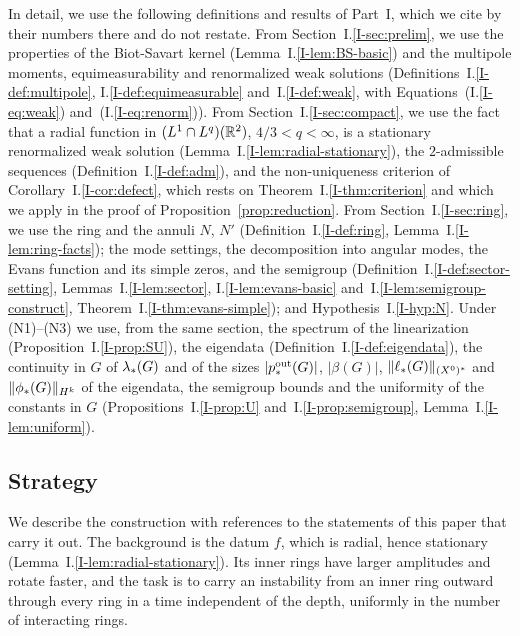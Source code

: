 In detail, we use the following definitions and results of Part~I, which we
cite by their numbers there and do not restate. From
Section~I.\ref{I-sec:prelim}, we use the properties of the Biot-Savart kernel
(Lemma~I.\ref{I-lem:BS-basic}) and the multipole moments, equimeasurability and
renormalized weak solutions (Definitions~I.\ref{I-def:multipole},
I.\ref{I-def:equimeasurable} and~I.\ref{I-def:weak}, with
Equations~(I.\ref{I-eq:weak}) and~(I.\ref{I-eq:renorm})). From
Section~I.\ref{I-sec:compact}, we use the fact that a radial function in
$(L^1\cap L^q)(\mathbb{R}^2)$, $4/3<q<\infty$, is a stationary renormalized weak
solution (Lemma~I.\ref{I-lem:radial-stationary}), the $2$-admissible sequences
(Definition~I.\ref{I-def:adm}), and the non-uniqueness criterion of
Corollary~I.\ref{I-cor:defect}, which rests on Theorem~I.\ref{I-thm:criterion}
and which we apply in the proof of Proposition~\ref{prop:reduction}. From
Section~I.\ref{I-sec:ring}, we use the ring and the annuli $N$, $N'$
(Definition~I.\ref{I-def:ring}, Lemma~I.\ref{I-lem:ring-facts}); the mode
settings, the decomposition into angular modes, the Evans function and its
simple zeros, and the semigroup (Definition~I.\ref{I-def:sector-setting},
Lemmas~I.\ref{I-lem:sector}, I.\ref{I-lem:evans-basic}
and~I.\ref{I-lem:semigroup-construct}, Theorem~I.\ref{I-thm:evans-simple}); and
Hypothesis~I.\ref{I-hyp:N}. Under \textup{(N1)}--\textup{(N3)} we use, from the
same section, the spectrum of the linearization (Proposition~I.\ref{I-prop:SU}),
the eigendata (Definition~I.\ref{I-def:eigendata}), the continuity in $G$ of
$\lambda_*(G)$ and of the sizes $|p^{\mathrm{out}}_*(G)|$, $|\beta(G)|$,
$\|\ell_*(G)\|_{(X^0)^*}$ and $\|\phi_*(G)\|_{H^k}$ of the eigendata, the
semigroup bounds and the uniformity of the constants in $G$
(Propositions~I.\ref{I-prop:U} and~I.\ref{I-prop:semigroup},
Lemma~I.\ref{I-lem:uniform}).

\subsection{Strategy}

We describe the construction with references to the statements of this paper
that carry it out. The background is the datum $f$, which is radial, hence
stationary (Lemma~I.\ref{I-lem:radial-stationary}). Its inner rings have larger
amplitudes and rotate faster, and the task is to
carry an instability from an inner ring outward through every ring in a time
independent of the depth, uniformly in the number of interacting rings.

